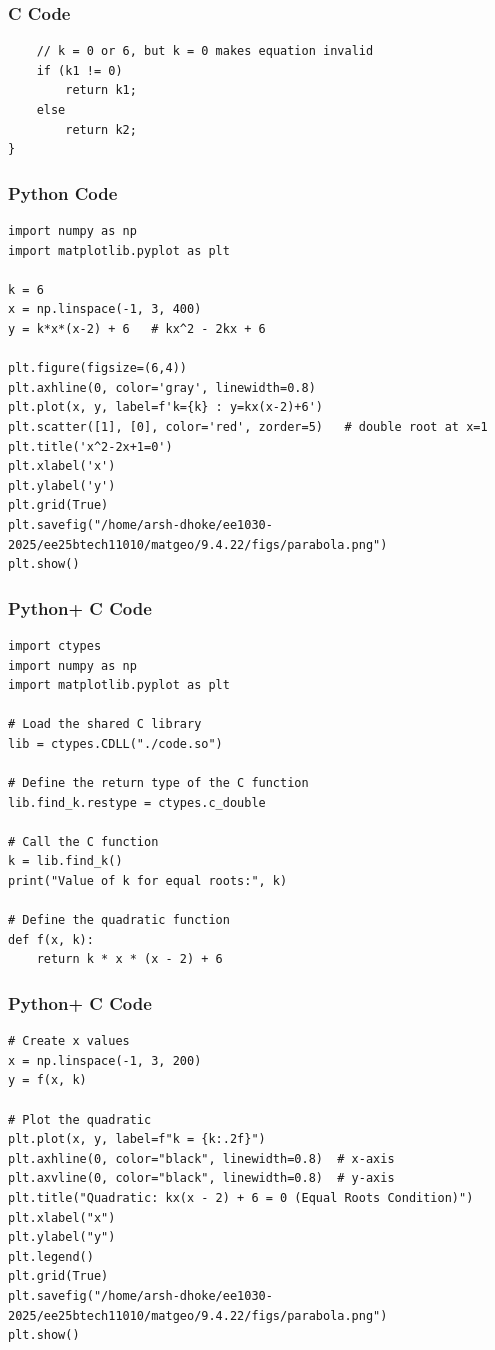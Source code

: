 \documentclass{beamer}
\begin{document}
\begin{frame}[fragile]
    \frametitle{C Code}
\begin{lstlisting}
    // k = 0 or 6, but k = 0 makes equation invalid
    if (k1 != 0)
        return k1;
    else
        return k2;
}

\end{lstlisting}
\end{frame}


\begin{frame}[fragile]
    \frametitle{Python Code}
\begin{lstlisting}
import numpy as np
import matplotlib.pyplot as plt

k = 6
x = np.linspace(-1, 3, 400)
y = k*x*(x-2) + 6   # kx^2 - 2kx + 6

plt.figure(figsize=(6,4))
plt.axhline(0, color='gray', linewidth=0.8)
plt.plot(x, y, label=f'k={k} : y=kx(x-2)+6')
plt.scatter([1], [0], color='red', zorder=5)   # double root at x=1
plt.title('x^2-2x+1=0')
plt.xlabel('x')
plt.ylabel('y')
plt.grid(True)
plt.savefig("/home/arsh-dhoke/ee1030-2025/ee25btech11010/matgeo/9.4.22/figs/parabola.png")
plt.show()

\end{lstlisting}
\end{frame}

\begin{frame}[fragile]
    \frametitle{Python+ C Code}
\begin{lstlisting}
import ctypes
import numpy as np
import matplotlib.pyplot as plt

# Load the shared C library
lib = ctypes.CDLL("./code.so")

# Define the return type of the C function
lib.find_k.restype = ctypes.c_double

# Call the C function
k = lib.find_k()
print("Value of k for equal roots:", k)

# Define the quadratic function
def f(x, k):
    return k * x * (x - 2) + 6
\end{lstlisting}
\end{frame}

\begin{frame}[fragile]
    \frametitle{Python+ C Code}
\begin{lstlisting}
# Create x values
x = np.linspace(-1, 3, 200)
y = f(x, k)

# Plot the quadratic
plt.plot(x, y, label=f"k = {k:.2f}")
plt.axhline(0, color="black", linewidth=0.8)  # x-axis
plt.axvline(0, color="black", linewidth=0.8)  # y-axis
plt.title("Quadratic: kx(x - 2) + 6 = 0 (Equal Roots Condition)")
plt.xlabel("x")
plt.ylabel("y")
plt.legend()
plt.grid(True)
plt.savefig("/home/arsh-dhoke/ee1030-2025/ee25btech11010/matgeo/9.4.22/figs/parabola.png")
plt.show()

\end{lstlisting}
\end{frame}
\end{document}
